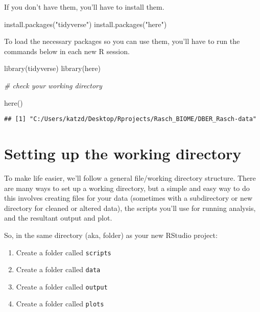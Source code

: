 \documentclass[
]{book}
\newenvironment{Shaded}{\begin{snugshade}}{\end{snugshade}}
\newcommand{\CommentTok}[1]{\textcolor[rgb]{0.56,0.35,0.01}{\textit{#1}}}
\newcommand{\FunctionTok}[1]{\textcolor[rgb]{0.00,0.00,0.00}{#1}}
\newcommand{\NormalTok}[1]{#1}
\newcommand{\StringTok}[1]{\textcolor[rgb]{0.31,0.60,0.02}{#1}}
\providecommand{\tightlist}{%
  \setlength{\itemsep}{0pt}\setlength{\parskip}{0pt}}
\begin{document}
If you don't have them, you'll have to install them.

\begin{Shaded}
\begin{Highlighting}[]
\FunctionTok{install.packages}\NormalTok{(}\StringTok{"tidyverse"}\NormalTok{)}
\FunctionTok{install.packages}\NormalTok{(}\StringTok{"here"}\NormalTok{)}
\end{Highlighting}
\end{Shaded}

To load the necessary packages so you can use them, you'll have to run the commands below in each new R session.

\begin{Shaded}
\begin{Highlighting}[]
\FunctionTok{library}\NormalTok{(tidyverse)}
\FunctionTok{library}\NormalTok{(here)}

\CommentTok{\# check your working directory}

\FunctionTok{here}\NormalTok{()}
\end{Highlighting}
\end{Shaded}

\begin{verbatim}
## [1] "C:/Users/katzd/Desktop/Rprojects/Rasch_BIOME/DBER_Rasch-data"
\end{verbatim}

\hypertarget{setting-up-the-working-directory}{%
\section{Setting up the working directory}\label{setting-up-the-working-directory}}

To make life easier, we'll follow a general file/working directory structure. There are many ways to set up a working directory, but a simple and easy way to do this involves creating files for your data (sometimes with a subdirectory or new directory for cleaned or altered data), the scripts you'll use for running analysis, and the resultant output and plot.

So, in the same directory (aka, folder) as your new RStudio project:

\begin{enumerate}
\def\labelenumi{\arabic{enumi}.}
\tightlist
\item
  Create a folder called \texttt{scripts}
\item
  Create a folder called \texttt{data}
\item
  Create a folder called \texttt{output}
\item
  Create a folder called \texttt{plots}
\end{enumerate}
\end{document}
